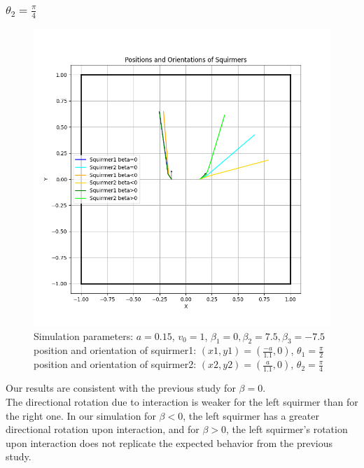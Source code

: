 \documentclass{article}
\begin{document}
\subsubsection{$\theta_2 = \frac{\pi}{4}$}
\begin{figure}[h]
   \centering
   \includegraphics[width=1\textwidth]{graphs/simulations/twosquirmerinter/sq2.pi.4.png}
   \caption{\footnotesize Simulation parameters: $a=0.15$, $v_0=1$, $\beta_1=0, \beta_2=7.5, \beta_3=-7.5$\\
   position and orientation of squirmer1: $(x1,y1)=(\frac{-a}{1.1},0)$, $\theta_1=\frac{\pi}{2}$\\
   position and orientation of squirmer2: $(x2,y2)=(\frac{a}{1.1},0)$, $\theta_2=\frac{\pi}{4}$}
\end{figure}
Our results are consistent with the previous study for $\beta = 0$.\\
The directional rotation due to interaction is weaker for the left squirmer than for the right one.
 In our simulation for $\beta < 0$, the left squirmer has a greater directional rotation upon interaction,
 and for $\beta > 0$, the left squirmer's rotation upon interaction does not replicate the expected behavior from the previous study.\\

\newpage
\end{document}
